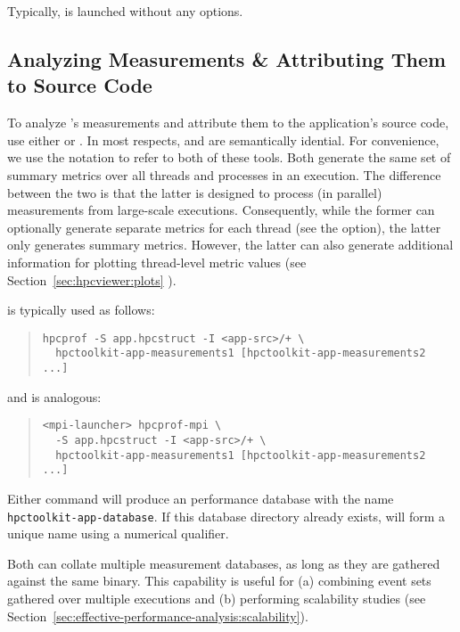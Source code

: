 \documentclass[11pt,letterpaper]{report}
\begin{document}
Typically, \hpcstruct{} is launched without any options.



\subsection{Analyzing Measurements \& Attributing Them to Source Code}

To analyze \HPCToolkit{}'s measurements and attribute them to the application's source code, use either \hpcprof{} or \hpcprofmpi{}.
In most respects, \hpcprof{} and \hpcprofmpi{} are semantically idential. For convenience, we use the notation \hpcprofAll{} to refer to both of these tools.
Both generate the same set of summary metrics over all threads and processes in an execution.
The difference between the two is that the latter is designed to process (in parallel) measurements from large-scale executions.
Consequently, while the former can optionally generate separate metrics for each thread (see the  option), the latter only generates summary metrics.
However, the latter can also generate additional information for plotting thread-level metric values (see Section~\ref{sec:hpcviewer:plots}%
).

\hpcprof{} is typically used as follows:
\begin{quote}
\begin{verbatim}
hpcprof -S app.hpcstruct -I <app-src>/+ \
  hpctoolkit-app-measurements1 [hpctoolkit-app-measurements2 ...]
\end{verbatim}
\end{quote}
and \hpcprofmpi{} is analogous:
\begin{quote}
\begin{verbatim}
<mpi-launcher> hpcprof-mpi \
  -S app.hpcstruct -I <app-src>/+ \
  hpctoolkit-app-measurements1 [hpctoolkit-app-measurements2 ...]
\end{verbatim}
\end{quote}
Either command will produce an \HPCToolkit{} performance database with the name \texttt{hpctoolkit-app-database}.
If this database directory already exists, \hpcprofAll{} will form a unique name using a numerical qualifier.

Both \hpcprofAll{} can collate multiple measurement databases, as long as they are gathered against the same binary.
This capability is useful for (a) combining event sets gathered over multiple executions and (b) performing scalability studies (see Section~\ref{sec:effective-performance-analysis:scalability}).
\end{document}
